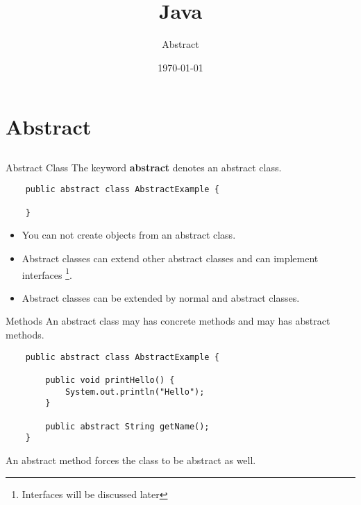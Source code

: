 


\title{Java}
\subtitle{Abstract}
\date{\today}



\begin{frame}
    \titlepage
\end{frame}

\section{Abstract}
\subsection{}
\begin{frame}[fragile]{Abstract Class}
    The keyword \textbf{abstract} denotes an abstract class.
    \vfill
    \begin{lstlisting}
    public abstract class AbstractExample {
    
    }    
    \end{lstlisting}
    \vfill
    \begin{itemize}
    \item You can not create objects from an abstract class.\\
    \item Abstract classes can extend other abstract classes and can implement interfaces \footnote[1]{Interfaces will be discussed later}.\\
    \item Abstract classes can be extended by normal and abstract classes.
    \end{itemize}
\end{frame}

\begin{frame}[fragile]{Methods}
    An abstract class may has concrete methods and may has abstract methods.
    \begin{lstlisting}
    public abstract class AbstractExample {
    
        public void printHello() {
            System.out.println("Hello");        
        }
        
        public abstract String getName();
    }    
    \end{lstlisting}
    An abstract method forces the class to be abstract as well. \\
\end{frame}

